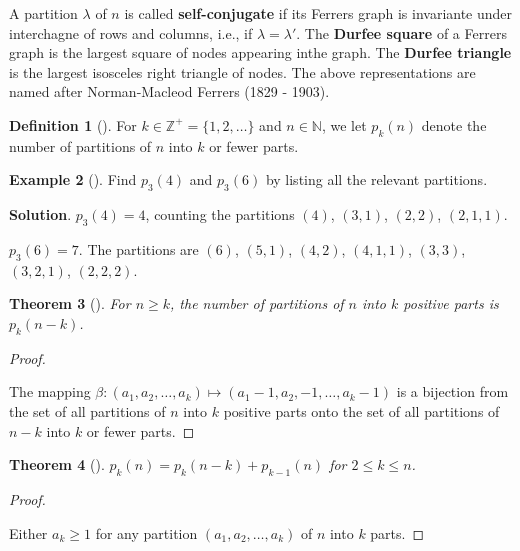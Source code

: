 \documentclass[10pt,]{book}
\newcommand{\terminology}[1]{\textbf{#1}}
\theoremstyle{plain}
\newtheorem{theorem}{Theorem}[section]
\theoremstyle{definition}
\newtheorem{definition}[theorem]{Definition}
\theoremstyle{definition}
\newtheorem{example}[theorem]{Example}
\theoremstyle{definition}
\theoremstyle{definition}
\numberwithin{equation}{chapter}
\def\N{\mathbb N}
\def\Z{\mathbb Z}
\begin{document}
\par
\hypertarget{p-1110}{}%
A partition \(\lambda\) of \(n\) is called \terminology{self-conjugate} if its Ferrers graph is invariante under interchagne of rows and columns, i.e., if \(\lambda = \lambda'\).  The \terminology{Durfee square} of a Ferrers graph is the largest square of nodes appearing inthe graph.  The \terminology{Durfee triangle} is the largest isosceles right triangle of nodes.  The above representations are named after Norman-Macleod Ferrers (1829 - 1903).%
\begin{definition}[{}]\label{def-numpartitions}
\hypertarget{p-1111}{}%
For \(k \in \Z^+ = \{1,2,\ldots\}\) and \(n \in \N\), we let \(p_k(n)\) denote the number of partitions of \(n\) into \(k\) or fewer parts.%
\end{definition}
\begin{example}[]\label{ex_partitions3parts}
\hypertarget{p-1112}{}%
Find \(p_3(4)\) and \(p_3(6)\) by listing all the relevant partitions.%
\par\smallskip%
\noindent\textbf{Solution}.\hypertarget{solution-116}{}\quad%
\hypertarget{p-1113}{}%
\(p_3(4) = 4\), counting the partitions \((4)\), \((3,1)\), \((2,2)\), \((2,1,1)\).%
\par
\hypertarget{p-1114}{}%
\(p_3(6) = 7\).  The partitions are \((6)\), \((5,1)\), \((4,2)\), \((4,1,1)\), \((3,3)\), \((3,2,1)\), \((2,2,2)\).%
\end{example}
\begin{theorem}[{}]\label{thm-positiveparts}
\hypertarget{p-1115}{}%
For \(n \ge k\), the number of partitions of \(n\) into \(k\) positive parts is \(p_k(n-k)\).%
\end{theorem}
\begin{proof}\hypertarget{proof-14}{}
\hypertarget{p-1116}{}%
The mapping \(\beta: (a_1, a_2, \ldots, a_k) \mapsto (a_1 - 1, a_2, -1, \ldots, a_k-1)\) is a bijection from the set of all partitions of \(n\) into \(k\) positive parts onto the set of all partitions of \(n-k\) into \(k\) or fewer parts.%
\end{proof}
\begin{theorem}[{}]\label{thm-partitionrecurrence}
\hypertarget{p-1117}{}%
\(p_k(n) = p_k(n-k) + p_{k-1}(n)\) for \(2 \le k \le n\).%
\end{theorem}
\begin{proof}\hypertarget{proof-15}{}
\hypertarget{p-1118}{}%
Either \(a_k \ge 1\) for any partition \((a_1, a_2, \ldots, a_k)\) of \(n\) into \(k\) parts.%
\end{proof}
\end{document}

